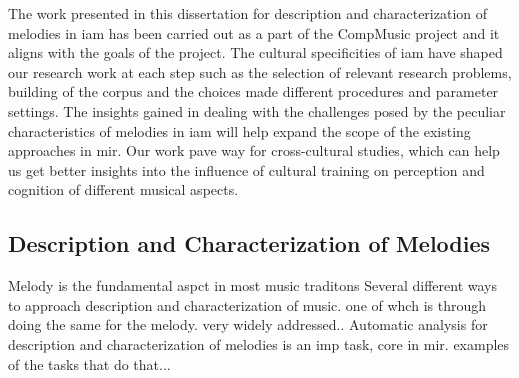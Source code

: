 The work presented in this dissertation for description and characterization of melodies in \gls{iam} has been carried out as a part of the CompMusic project and it aligns with the goals of the project. The cultural specificities of \gls{iam} have shaped our research work at each step such as the selection of relevant research problems, building of the corpus and the choices made different procedures and parameter settings. The insights gained in dealing with the challenges posed by the peculiar characteristics of melodies in \gls{iam} will help expand the scope of the existing approaches in \gls{mir}. Our work pave way for cross-cultural studies, which can help us get better insights into the influence of cultural training on perception and cognition of different musical aspects.




\subsection{Description and Characterization of Melodies}
\label{sec:intro_description_characterization_melodies}

Melody is the fundamental aspct in most music traditons
Several different ways to approach description and characterization of music. one of whch is through doing the same for the melody. very widely addressed..
Automatic analysis for description and characterization of melodies is an imp task, core in mir. examples of the tasks that do that...


